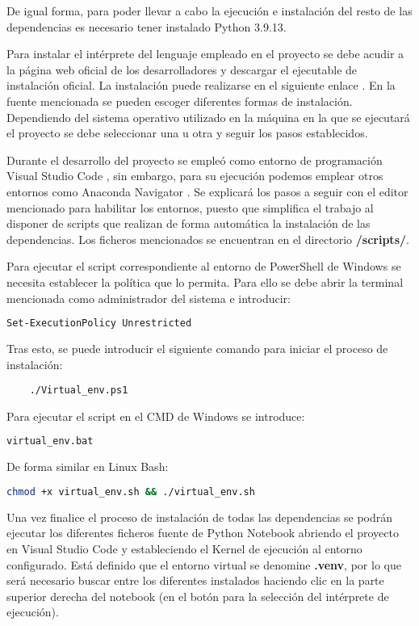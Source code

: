 De igual forma, para poder llevar a cabo la ejecución e instalación del resto de las dependencias es necesario tener instalado Python 3.9.13.

Para instalar el intérprete del lenguaje empleado en el proyecto se debe acudir a la página web oficial de los desarrolladores y descargar el ejecutable de instalación oficial.
La instalación puede realizarse en el siguiente enlace \cite{misc:python2023}.
En la fuente mencionada se pueden escoger diferentes formas de instalación. Dependiendo del sistema operativo utilizado en la máquina en la que se ejecutará el proyecto se debe seleccionar una
u otra y seguir los pasos establecidos.

Durante el desarrollo del proyecto se empleó como entorno de programación Visual Studio Code \cite{misc:code2023}, sin embargo, para su ejecución podemos emplear otros entornos como 
Anaconda Navigator \cite{misc:conda2023}.
Se explicará los pasos a seguir con el editor mencionado para habilitar los entornos, puesto que simplifica el trabajo al disponer de scripts que realizan de forma automática 
la instalación de las dependencias.
Los ficheros mencionados se encuentran en el directorio \textbf{/scripts/}.

Para ejecutar el script correspondiente al entorno de PowerShell de Windows se necesita establecer la política que lo permita. Para ello se debe abrir la terminal mencionada
como administrador del sistema e introducir: 
\begin{lstlisting}[language=Bash]
    Set-ExecutionPolicy Unrestricted    
\end{lstlisting}

Tras esto, se puede introducir el siguiente comando para iniciar el proceso de instalación: 
\begin{lstlisting}
    ./Virtual_env.ps1
\end{lstlisting}

Para ejecutar el script en el CMD de Windows se introduce:
\begin{lstlisting}[language=Bash]
    virtual_env.bat
\end{lstlisting}

De forma similar en Linux Bash:
\begin{lstlisting}[language=Bash]
    chmod +x virtual_env.sh && ./virtual_env.sh    
\end{lstlisting}

Una vez finalice el proceso de instalación de todas las dependencias se podrán ejecutar los diferentes ficheros fuente de Python Notebook abriendo el proyecto en Visual Studio Code
y estableciendo el Kernel de ejecución al entorno configurado. Está definido que el entorno virtual se denomine \textbf{.venv}, por lo que será necesario buscar entre los diferentes 
instalados haciendo clic en la parte superior derecha del notebook (en el botón para la selección del intérprete de ejecución).

